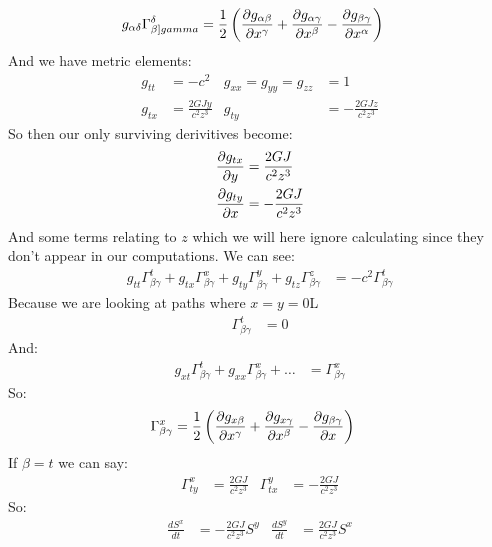 \begin{align*}
	g_{\alpha\delta} \Gamma^\delta_{\beta]gamma} &= \frac{1}{2} \left(\frac{\partial g_{\alpha\beta}}{\partial x^\gamma} + \frac{\partial g_{\alpha\gamma}}{\partial x^\beta} - \frac{\partial g_{\beta\gamma}}{\partial x^\alpha}\right)
\end{align*}
And we have metric elements:
\begin{align*}
	g_{tt} &= -c^2 & g_{xx} = g_{yy} = g_{zz} &= 1 \\
	g_{tx} &= \frac{2GJy}{c^2 z^3} & g_{ty} &= -\frac{2GJz}{c^2z^3}
\end{align*}
So then our only surviving derivitives become:
\begin{align*}
	\frac{\partial g_{tx}}{\partial y} &= \frac{2GJ}{c^2z^3} \\
	\frac{\partial g_{ty}}{\partial x} &= -\frac{2GJ}{c^2z^3}
\end{align*}
And some terms relating to $z$ which we will here ignore calculating since they don't appear in our computations. We can see:
\begin{align*}
	g_{tt}\Gamma^t_{\beta\gamma} + g_{tx} \Gamma^x_{\beta\gamma} + g_{ty} \Gamma^y_{\beta\gamma} + g_{tz} \Gamma^z_{\beta\gamma} &= -c^2\Gamma^t_{\beta\gamma}
\end{align*}
Because we are looking at paths where $x=y=0$L
\begin{align*}
	\Gamma^t_{\beta\gamma} &= 0
\end{align*}
And:
\begin{align*}
	g_{xt}\Gamma^t_{\beta\gamma} + g_{xx}\Gamma^x_{\beta\gamma} + \ldots &= \Gamma^x_{\beta\gamma}
\end{align*}
So:
\begin{align*}
	\Gamma^x_{\beta\gamma} &= \frac{1}{2}\left(\frac{\partial g_{x\beta}}{\partial x^\gamma} + \frac{\partial g_{x\gamma}}{\partial x^\beta} - \frac{\partial g_{\beta\gamma}}{\partial x}\right)
\end{align*}
If $\beta = t$ we can say:
\begin{align*}
	\Gamma^x_{ty} &= \frac{2GJ}{c^2z^3} & \Gamma^y_{tx} &= -\frac{2GJ}{c^2z^3}
\end{align*}
So:
\begin{align*}
	\frac{dS^x}{dt} &= -\frac{2GJ}{c^2z^3}S^y & \frac{dS^y}{dt} &= \frac{2GJ}{c^2z^3} S^x
\end{align*}
